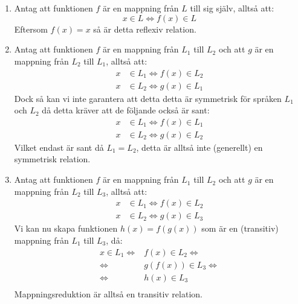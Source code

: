 \documentclass{article}
\begin{document}
\section{}

\begin{enumerate}[label=(\alph*)]
    \item
        Antag att funktionen $f$ är en mappning från $L$ till sig själv, alltså att:
        $$x \in L \iff f(x) \in L$$
        Eftersom $f(x)=x$ så är detta reflexiv relation.
    
    \item 
        Antag att funktionen $f$ är en mappning från $L_1$ till $L_2$ och att $g$ är en mappning från $L_2$ till $L_1$, alltså att: 
         \begin{align*}
            x & \in L_1 \iff f(x) \in L_2 \\
            x & \in L_2 \iff g(x) \in L_1
        \end{align*}
        Dock så kan vi inte garantera att detta detta är symmetrisk för språken $L_1$ och $L_2$ då detta kräver att de följande också är sant:
        \begin{align*}
            x & \in L_1 \iff f(x) \in L_1 \\
            x & \in L_2 \iff g(x) \in L_2
        \end{align*}
        Vilket endast är sant då $L_1 = L_2$, detta är alltså inte (generellt) en  symmetrisk relation.
        
    \item 
        Antag att funktionen $f$ är en mappning från $L_1$ till $L_2$ och att $g$ är en mappning från $L_2$ till $L_3$, alltså att:
        \begin{align*}
            x & \in L_1 \iff f(x) \in L_2 \\
            x & \in L_2 \iff g(x) \in L_3
        \end{align*}
        Vi kan nu skapa funktionen $h(x) = f(g(x))$ som är en (transitiv) mappning från $L_1$ till $L_3$, då:
        \begin{align*}
            x \in L_1 \iff &f(x) \in L_2 \iff \\
            \iff &g(f(x)) \in L_3 \iff \\ 
            \iff &h(x) \in L_3 \\
        \end{align*}
        Mappningsreduktion är alltså en transitiv relation.
        
        


\end{enumerate}
\end{document}
